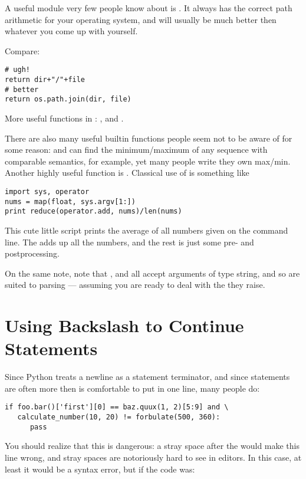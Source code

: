 \documentclass{howto}
\begin{document}
A useful module very few people know about is . It 
always has the correct path arithmetic for your operating system, and
will usually be much better then whatever you come up with yourself.

Compare:

\begin{verbatim}
# ugh!
return dir+"/"+file
# better
return os.path.join(dir, file)
\end{verbatim}

More useful functions in : , 
 and .

There are also many useful builtin functions people seem not to be
aware of for some reason:  and  can
find the minimum/maximum of any sequence with comparable semantics,
for example, yet many people write they own max/min. Another highly
useful function is . Classical use of 
is something like

\begin{verbatim}
import sys, operator
nums = map(float, sys.argv[1:])
print reduce(operator.add, nums)/len(nums)
\end{verbatim}

This cute little script prints the average of all numbers given on the
command line. The  adds up all the numbers, and
the rest is just some pre- and postprocessing.

On the same note, note that ,  and
 all accept arguments of type string, and so are
suited to parsing --- assuming you are ready to deal with the
 they raise.

\section{Using Backslash to Continue Statements}

Since Python treats a newline as a statement terminator,
and since statements are often more then is comfortable to put
in one line, many people do:

\begin{verbatim}
if foo.bar()['first'][0] == baz.quux(1, 2)[5:9] and \
   calculate_number(10, 20) != forbulate(500, 360):
      pass
\end{verbatim}

You should realize that this is dangerous: a stray space after the
\code{\\} would make this line wrong, and stray spaces are notoriously
hard to see in editors. In this case, at least it would be a syntax
error, but if the code was:
\end{document}
